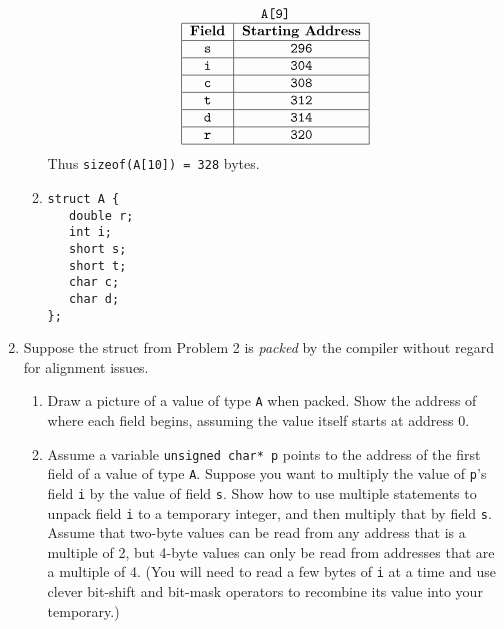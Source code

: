 \documentclass[9pt]{article}
\begin{document}
\begin{enumerate}
\begin{enumerate}
$$\begin{tabular}{@{}|c|c|@{}}
                     \multicolumn{2}{c}{\texttt{A[9]}} \\ \hline
                     \textbf{Field} & \textbf{Starting Address} \\ \hline
                     \verb|s| & \verb|296| \\ \hline
                     \verb|i| & \verb|304| \\ \hline
                     \verb|c| & \verb|308| \\ \hline
                     \verb|t| & \verb|312| \\ \hline
                     \verb|d| & \verb|314| \\ \hline
                     \verb|r| & \verb|320| \\ \hline
                  \end{tabular}
               $$
               Thus \verb|sizeof(A[10]) = 328| bytes.
         \item \verb|struct A {| \\
               \verb|   double r;| \\
               \verb|   int i;| \\
               \verb|   short s;| \\
               \verb|   short t;| \\
               \verb|   char c;| \\
               \verb|   char d;| \\
               \verb|};| \\
      \end{enumerate}
   \item Suppose the struct from Problem 2 is \textit{packed} by the compiler
         without regard for alignment issues.

         \begin{enumerate}
            \item Draw a picture of a value of type \verb|A| when packed. Show
                  the address of where each field begins, assuming the value
                  itself starts at address 0.
            \item Assume a variable \verb|unsigned char* p| points to the
                  address of the first field of a value of type \verb|A|.
                  Suppose you want to multiply the value of \verb|p|'s field
                  \verb|i| by the value of field \verb|s|. Show how to use
                  multiple statements to unpack field \verb|i| to a temporary
                  integer, and then multiply that by field \verb|s|. Assume that
                  two-byte values can be read from any address that is a
                  multiple of 2, but 4-byte values can only be read from
                  addresses that are a multiple of 4. (You will need to read a
                  few bytes of \verb|i| at a time and use clever bit-shift and
                  bit-mask operators to recombine its value into your
                  temporary.)
         \end{enumerate}


\end{enumerate}
\end{document}

